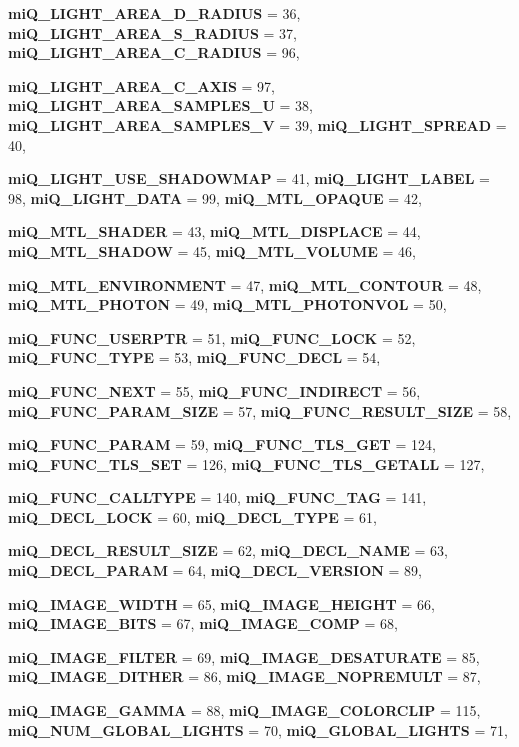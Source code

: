 \begin{CompactItemize}
{\bf mi\-Q\_\-LIGHT\_\-AREA\_\-D\_\-RADIUS} =  36, 
{\bf mi\-Q\_\-LIGHT\_\-AREA\_\-S\_\-RADIUS} =  37, 
{\bf mi\-Q\_\-LIGHT\_\-AREA\_\-C\_\-RADIUS} =  96, 
\par
{\bf mi\-Q\_\-LIGHT\_\-AREA\_\-C\_\-AXIS} =  97, 
{\bf mi\-Q\_\-LIGHT\_\-AREA\_\-SAMPLES\_\-U} =  38, 
{\bf mi\-Q\_\-LIGHT\_\-AREA\_\-SAMPLES\_\-V} =  39, 
{\bf mi\-Q\_\-LIGHT\_\-SPREAD} =  40, 
\par
{\bf mi\-Q\_\-LIGHT\_\-USE\_\-SHADOWMAP} =  41, 
{\bf mi\-Q\_\-LIGHT\_\-LABEL} =  98, 
{\bf mi\-Q\_\-LIGHT\_\-DATA} =  99, 
{\bf mi\-Q\_\-MTL\_\-OPAQUE} =  42, 
\par
{\bf mi\-Q\_\-MTL\_\-SHADER} =  43, 
{\bf mi\-Q\_\-MTL\_\-DISPLACE} =  44, 
{\bf mi\-Q\_\-MTL\_\-SHADOW} =  45, 
{\bf mi\-Q\_\-MTL\_\-VOLUME} =  46, 
\par
{\bf mi\-Q\_\-MTL\_\-ENVIRONMENT} =  47, 
{\bf mi\-Q\_\-MTL\_\-CONTOUR} =  48, 
{\bf mi\-Q\_\-MTL\_\-PHOTON} =  49, 
{\bf mi\-Q\_\-MTL\_\-PHOTONVOL} =  50, 
\par
{\bf mi\-Q\_\-FUNC\_\-USERPTR} =  51, 
{\bf mi\-Q\_\-FUNC\_\-LOCK} =  52, 
{\bf mi\-Q\_\-FUNC\_\-TYPE} =  53, 
{\bf mi\-Q\_\-FUNC\_\-DECL} =  54, 
\par
{\bf mi\-Q\_\-FUNC\_\-NEXT} =  55, 
{\bf mi\-Q\_\-FUNC\_\-INDIRECT} =  56, 
{\bf mi\-Q\_\-FUNC\_\-PARAM\_\-SIZE} =  57, 
{\bf mi\-Q\_\-FUNC\_\-RESULT\_\-SIZE} =  58, 
\par
{\bf mi\-Q\_\-FUNC\_\-PARAM} =  59, 
{\bf mi\-Q\_\-FUNC\_\-TLS\_\-GET} =  124, 
{\bf mi\-Q\_\-FUNC\_\-TLS\_\-SET} =  126, 
{\bf mi\-Q\_\-FUNC\_\-TLS\_\-GETALL} =  127, 
\par
{\bf mi\-Q\_\-FUNC\_\-CALLTYPE} =  140, 
{\bf mi\-Q\_\-FUNC\_\-TAG} =  141, 
{\bf mi\-Q\_\-DECL\_\-LOCK} =  60, 
{\bf mi\-Q\_\-DECL\_\-TYPE} =  61, 
\par
{\bf mi\-Q\_\-DECL\_\-RESULT\_\-SIZE} =  62, 
{\bf mi\-Q\_\-DECL\_\-NAME} =  63, 
{\bf mi\-Q\_\-DECL\_\-PARAM} =  64, 
{\bf mi\-Q\_\-DECL\_\-VERSION} =  89, 
\par
{\bf mi\-Q\_\-IMAGE\_\-WIDTH} =  65, 
{\bf mi\-Q\_\-IMAGE\_\-HEIGHT} =  66, 
{\bf mi\-Q\_\-IMAGE\_\-BITS} =  67, 
{\bf mi\-Q\_\-IMAGE\_\-COMP} =  68, 
\par
{\bf mi\-Q\_\-IMAGE\_\-FILTER} =  69, 
{\bf mi\-Q\_\-IMAGE\_\-DESATURATE} =  85, 
{\bf mi\-Q\_\-IMAGE\_\-DITHER} =  86, 
{\bf mi\-Q\_\-IMAGE\_\-NOPREMULT} =  87, 
\par
{\bf mi\-Q\_\-IMAGE\_\-GAMMA} =  88, 
{\bf mi\-Q\_\-IMAGE\_\-COLORCLIP} =  115, 
{\bf mi\-Q\_\-NUM\_\-GLOBAL\_\-LIGHTS} =  70, 
{\bf mi\-Q\_\-GLOBAL\_\-LIGHTS} =  71, 

\end{CompactItemize}
